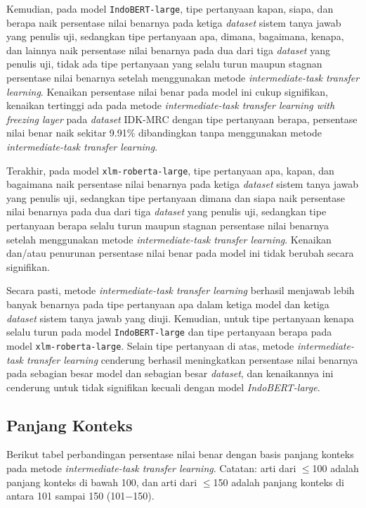 Kemudian, pada model \texttt{IndoBERT-large}, tipe pertanyaan kapan, siapa, dan berapa naik persentase nilai benarnya pada ketiga \emph{dataset} sistem tanya jawab yang penulis uji, sedangkan tipe pertanyaan apa, dimana, bagaimana, kenapa, dan lainnya naik persentase nilai benarnya pada dua dari tiga \emph{dataset} yang penulis uji, tidak ada tipe pertanyaan yang selalu turun maupun stagnan persentase nilai benarnya setelah menggunakan metode \emph{intermediate-task transfer learning}. Kenaikan persentase nilai benar pada model ini cukup signifikan, kenaikan tertinggi ada pada metode \emph{intermediate-task transfer learning with freezing layer} pada \emph{dataset} IDK-MRC dengan tipe pertanyaan berapa, persentase nilai benar naik sekitar 9.91\% dibandingkan tanpa menggunakan metode \emph{intermediate-task transfer learning}.

Terakhir, pada model \texttt{xlm-roberta-large}, tipe pertanyaan apa, kapan, dan bagaimana naik persentase nilai benarnya pada ketiga \emph{dataset} sistem tanya jawab yang penulis uji, sedangkan tipe pertanyaan dimana dan siapa naik persentase nilai benarnya pada dua dari tiga \emph{dataset} yang penulis uji, sedangkan tipe pertanyaan berapa selalu turun maupun stagnan persentase nilai benarnya setelah menggunakan metode \emph{intermediate-task transfer learning}. Kenaikan dan/atau penurunan persentase nilai benar pada model ini tidak berubah secara signifikan.

Secara pasti, metode \emph{intermediate-task transfer learning} berhasil menjawab lebih banyak benarnya pada tipe pertanyaan apa dalam ketiga model dan ketiga \emph{dataset} sistem tanya jawab yang diuji. Kemudian, untuk tipe pertanyaan kenapa selalu turun pada model \texttt{IndoBERT-large} dan tipe pertanyaan berapa pada model \texttt{xlm-roberta-large}. Selain tipe pertanyaan di atas, metode \emph{intermediate-task transfer learning} cenderung berhasil meningkatkan persentase nilai benarnya pada sebagian besar model dan sebagian besar \emph{dataset}, dan kenaikannya ini cenderung untuk tidak signifikan kecuali dengan model \emph{IndoBERT-large}. 

\subsection{Panjang Konteks}
Berikut tabel perbandingan persentase nilai benar dengan basis panjang konteks pada metode \emph{intermediate-task transfer learning}. Catatan: arti dari $\leq$100 adalah panjang konteks di bawah 100, dan arti dari $\leq$150 adalah panjang konteks di antara 101 sampai 150 (101$-$150).

